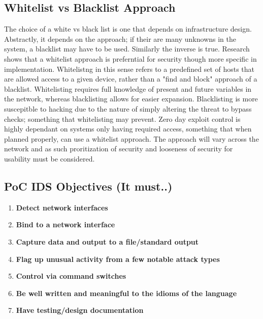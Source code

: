 \subsection{Whitelist vs Blacklist Approach}
The choice of a white vs black list is one that depends on infrastructure design. Abstractly, it depends on the approach; if their are many unknowns in the system, a blacklist may have to be used. 
Similarly the inverse is true. Research shows that a whitelist approach is preferntial for security though more specific in implementation. Whitelistng in this sense refers to a predefined set of hosts
that are allowed access to a given device, rather than a "find and block" approach of a blacklist. Whitelisting requires full knowledge of present and future variables in the network, whereas blacklisting
allows for easier expansion. Blacklisting is more suscepitble to hacking due to the nature of simply altering the threat to bypass checks; something that whitelisting may prevent. Zero day exploit control is 
highly dependant on systems only having required access, something that when planned properly, can use a whitelist approach. The approach will vary across the network and as such proritization of security 
and looseness of security for usability must be considered.


\subsection{PoC IDS Objectives (It must..)}
\begin{enumerate}
	\item \textbf{Detect network interfaces}
	\item \textbf{Bind to a network interface}
	\item \textbf{Capture data and output to a file/standard output}
	\item \textbf{Flag up unusual activity from a few notable attack types}
	\item \textbf{Control via command switches}
	\item \textbf{Be well written and meaningful to the idioms of the language}
	\item \textbf{Have testing/design documentation}
	
\end{enumerate}


